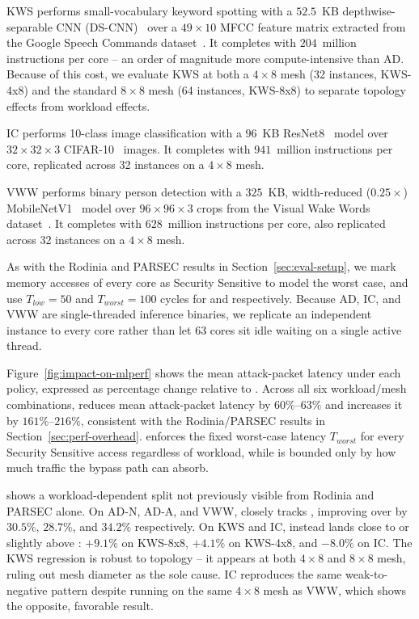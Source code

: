 KWS performs small-vocabulary keyword spotting with a $52.5$~KB depthwise-separable CNN (DS-CNN)~\cite{zhang2017hello} over a $49\times10$ MFCC feature matrix extracted from the Google Speech Commands dataset~\cite{warden2018speech}. 
It completes with $204$~million instructions per core -- an order of magnitude more compute-intensive than AD.
Because of this cost, we evaluate KWS at both a $4\times8$ mesh (32 instances, KWS-4x8) and the standard $8\times8$ mesh (64 instances, KWS-8x8) to separate topology effects from workload effects.

IC performs 10-class image classification with a $96$~KB ResNet8~\cite{he2016resnet} model over $32\times32\times3$ CIFAR-10~\cite{krizhevsky2009learning} images. 
It completes with $941$~million instructions per core, replicated across 32 instances on a $4\times8$ mesh.

VWW performs binary person detection with a $325$~KB, width-reduced ($0.25\times$) MobileNetV1~\cite{howard2017mobilenets} model over $96\times96\times3$ crops from the Visual Wake Words dataset~\cite{chowdhery2019vww}. 
It completes with $628$~million instructions per core, also replicated across 32 instances on a $4\times8$ mesh.

As with the Rodinia and PARSEC results in Section~\ref{sec:eval-setup}, we mark memory accesses of every core  as Security Sensitive to model the worst case, and use $T_{low}=50$ and $T_{worst}=100$ cycles for \bscheme{} and \jscheme{} respectively.
Because AD, IC, and VWW are single-threaded inference binaries, we replicate an independent instance to every core rather than let 63 cores sit idle waiting on a single active thread.

Figure~\ref{fig:impact-on-mlperf} shows the mean attack-packet latency under each policy, expressed as percentage change relative to \basescheme{}.
Across all six workload/mesh combinations, \basebscheme{} reduces mean attack-packet latency by $60\%$--$63\%$ and \jscheme{} increases it by $161\%$--$216\%$, consistent with the Rodinia/PARSEC results in Section~\ref{sec:perf-overhead}. 
\jscheme{} enforces the fixed worst-case latency $T_{worst}$ for every Security Sensitive access regardless of workload, while \basebscheme{} is bounded only by how much traffic the bypass path can absorb.

\bscheme{} shows a workload-dependent split not previously visible from Rodinia and PARSEC alone.
On AD-N, AD-A, and VWW, \bscheme{} closely tracks \basebscheme{}, improving over \basescheme{} by $30.5\%$, $28.7\%$, and $34.2\%$ respectively.
On KWS and IC, \bscheme{} instead lands close to or slightly above \basescheme{}: $+9.1\%$ on KWS-8x8, $+4.1\%$ on KWS-4x8, and $-8.0\%$ on IC.
The KWS regression is robust to topology -- it appears at both $4\times8$ and $8\times8$ mesh, ruling out mesh diameter as the sole cause. 
IC reproduces the same weak-to-negative pattern despite running on the same $4\times8$ mesh as VWW, which shows the opposite, favorable result.

